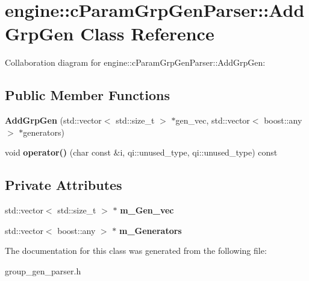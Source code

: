 \hypertarget{classengine_1_1cParamGrpGenParser_1_1AddGrpGen}{\section{engine\-:\-:c\-Param\-Grp\-Gen\-Parser\-:\-:Add\-Grp\-Gen Class Reference}
\label{classengine_1_1cParamGrpGenParser_1_1AddGrpGen}
}


Collaboration diagram for engine\-:\-:c\-Param\-Grp\-Gen\-Parser\-:\-:Add\-Grp\-Gen\-:
\subsection*{Public Member Functions}
\begin{DoxyCompactItemize}
\item 
\hypertarget{classengine_1_1cParamGrpGenParser_1_1AddGrpGen_a3159145eb4605d9c95b0485dc5d98820}{{\bfseries Add\-Grp\-Gen} (std\-::vector$<$ std\-::size\-\_\-t $>$ $\ast$gen\-\_\-vec, std\-::vector$<$ boost\-::any $>$ $\ast$generators)}\label{classengine_1_1cParamGrpGenParser_1_1AddGrpGen_a3159145eb4605d9c95b0485dc5d98820}

\item 
\hypertarget{classengine_1_1cParamGrpGenParser_1_1AddGrpGen_ad2a6ded93b96690296f31f5b13ed04ee}{void {\bfseries operator()} (char const \&i, qi\-::unused\-\_\-type, qi\-::unused\-\_\-type) const }\label{classengine_1_1cParamGrpGenParser_1_1AddGrpGen_ad2a6ded93b96690296f31f5b13ed04ee}

\end{DoxyCompactItemize}
\subsection*{Private Attributes}
\begin{DoxyCompactItemize}
\item 
\hypertarget{classengine_1_1cParamGrpGenParser_1_1AddGrpGen_ad7d8dd9a7866fca6000d791c50c205bb}{std\-::vector$<$ std\-::size\-\_\-t $>$ $\ast$ {\bfseries m\-\_\-\-Gen\-\_\-vec}}\label{classengine_1_1cParamGrpGenParser_1_1AddGrpGen_ad7d8dd9a7866fca6000d791c50c205bb}

\item 
\hypertarget{classengine_1_1cParamGrpGenParser_1_1AddGrpGen_a21539d542713e53a888967d176922b9a}{std\-::vector$<$ boost\-::any $>$ $\ast$ {\bfseries m\-\_\-\-Generators}}\label{classengine_1_1cParamGrpGenParser_1_1AddGrpGen_a21539d542713e53a888967d176922b9a}

\end{DoxyCompactItemize}


The documentation for this class was generated from the following file\-:\begin{DoxyCompactItemize}
\item 
group\-\_\-gen\-\_\-parser.\-h\end{DoxyCompactItemize}
